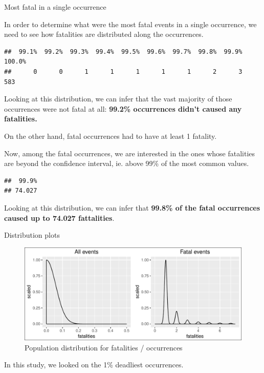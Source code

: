 \documentclass[]{article}
\begin{document}
Most fatal in a single occurrence

In order to determine what were the most fatal events in a single
occurrence, we need to see how fatalities are distributed along the
occurrences.

\begin{verbatim}
##  99.1%  99.2%  99.3%  99.4%  99.5%  99.6%  99.7%  99.8%  99.9% 100.0% 
##      0      0      1      1      1      1      1      2      3    583
\end{verbatim}

Looking at this distribution, we can infer that the vast majority of
those occurrences were not fatal at all: \textbf{99.2\% occurrences
didn't caused any fatalities.}

On the other hand, fatal occurrences had to have at least 1 fatality.

Now, among the fatal occurrences, we are interested in the ones whose
fatalities are beyond the confidence interval, ie. above 99\% of the
most common values.

\begin{verbatim}
##  99.9% 
## 74.027
\end{verbatim}

Looking at this distribution, we can infer that \textbf{99.8\% of the
fatal occurrences caused up to 74.027 fattalities}.

Distribution plots

\begin{figure}[htbp]
\centering
\includegraphics{readme_files/figure-latex/fatal-distr-4-1.pdf}
\caption{Population distribution for fatalities / occurrences}
\end{figure}

In this study, we looked on the 1\% deadliest occurrences.
\end{document}
